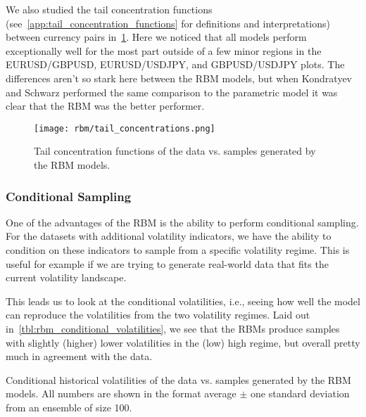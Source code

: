 We also studied the tail concentration functions (see~\cref{app:tail_concentration_functions} for definitions and interpretations) between currency pairs in~\cref{fig:rbm_tail_concentrations}.
Here we noticed that all models perform exceptionally well for the most part outside of a few minor regions in the EURUSD/GBPUSD, EURUSD/USDJPY, and GBPUSD/USDJPY plots.
The differences aren't so stark here between the RBM models, but when Kondratyev and Schwarz performed the same comparison to the parametric model it was clear that the RBM was the better performer.
\begin{figure}[!htb]
    \begin{center}
        \texttt{[image: rbm/tail\_concentrations.png]}
    \end{center}
    \caption{Tail concentration functions of the data vs. samples generated by the RBM models.}
    \label{fig:rbm_tail_concentrations}
\end{figure}

\subsubsection{Conditional Sampling}
One of the advantages of the RBM is the ability to perform conditional sampling.
For the datasets with additional volatility indicators, we have the ability to condition on these indicators to sample from a specific volatility regime.
This is useful for example if we are trying to generate real-world data that fits the current volatility landscape.

This leads us to look at the conditional volatilities, i.e., seeing how well the model can reproduce the volatilities from the two volatility regimes.
Laid out in~\cref{tbl:rbm_conditional_volatilities}, we see that the RBMs produce samples with slightly (higher) lower volatilities in the (low) high regime, but overall pretty much in agreement with the data.
\begin{table}[!htb]
    \centering
    \begin{adjustbox}{max width=\textwidth}
        
    \end{adjustbox}
    \caption{Conditional historical volatilities of the data vs. samples generated by the RBM models. All numbers are shown in the format average \(\pm\) one standard deviation from an ensemble of size 100.}
    \label{tbl:rbm_conditional_volatilities}
\end{table}

